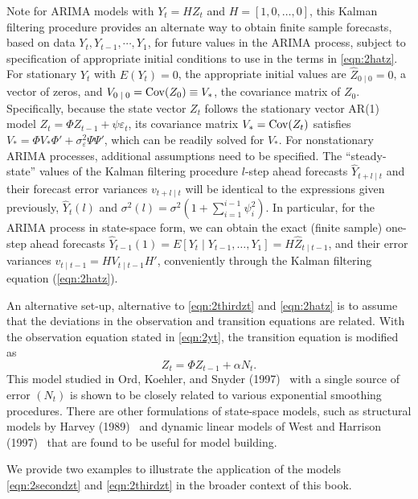 Note for ARIMA models with $Y_t = HZ_t$ and $H = [1,0,\ldots,0]$, this Kalman filtering procedure provides an alternate way to obtain finite sample forecasts, based on data $Y_t,Y_{t-1}, \cdots, Y_1$, for future values in the ARIMA process, subject to specification of appropriate initial conditions to use in the terms in \eqref{eqn:2hatz}. For stationary $Y_t$ with $E(Y_t)= 0$, the appropriate initial values are $\hat{Z}_{0 \;|\;0} = 0$, a vector of zeros, and $V_{0 \;|\;0} = \operatorname{Cov}(Z_0) \equiv V_*$, the covariance matrix of $Z_0$. Specifically, because the state vector $Z_t$ follows the stationary vector AR(1) model $Z_t = \Phi Z_{t-1} + \psi \varepsilon_t$, its covariance matrix $V_*= \operatorname{Cov}(Z_t)$ satisfies $V_*= \Phi V_* \Phi' + \sigma_{\varepsilon}^2 \Psi \Psi'$, which can be readily solved for $V_*$. For nonstationary ARIMA processes, additional assumptions need to be specified. The ``steady-state'' values of the Kalman filtering procedure $l$-step ahead forecasts $\hat{Y}_{t+l\;|\;t}$ and their forecast error variances $v_{t+l\;|\;t}$ will be identical to the expressions given previously, $\hat{Y}_t(l)$ and $\sigma^2(l) = \sigma^2 (1 + \sum_{i=1}^{i-1}\psi_{i}^2 )$. In particular, for the ARIMA process in state-space form, we can obtain the exact (finite sample) one-step ahead forecasts $\hat{Y}_{t-1}(1) = E[Y_t\;|\;Y_{t-1},\ldots,Y_1] = H \hat{Z}_{t \;|\; t-1}$, and their error variances $v_{t\;|\;t-1} = H V_{t\;|\;t-1} H'$, conveniently through the Kalman filtering equation (\ref{eqn:2hatz}). 


An alternative set-up, alternative to \eqref{eqn:2thirdzt} and \eqref{eqn:2hatz} is to assume that the deviations in the observation and transition equations are related. With the observation equation stated in \eqref{eqn:2yt}, the transition equation is modified as 
	\begin{equation} \label{eqn:223zt}
	Z_t = \Phi Z_{t-1} + \alpha N_t.
	\end{equation}
This model studied in Ord, Koehler, and Snyder (1997)~\cite{ord1997estimation} with a single source of error $(N_t)$ is shown to be closely related to various exponential smoothing procedures. There are other formulations of state-space models, such as structural models by Harvey (1989)~\cite{harvey1989kalman} and dynamic linear models of West and Harrison (1997)~\cite{west1997} that are found to be useful for model building.


We provide two examples to illustrate the application of the models \eqref{eqn:2secondzt} and \eqref{eqn:2thirdzt} in the broader context of this book. 


